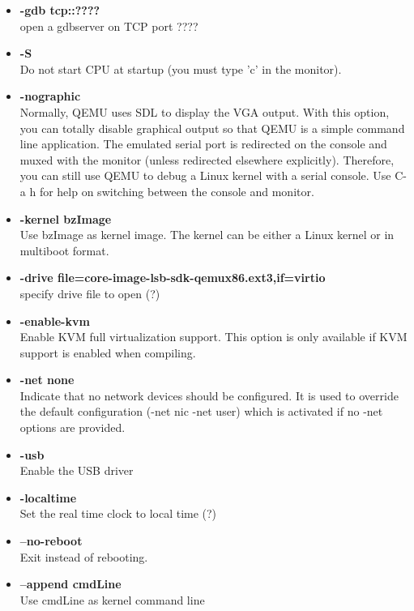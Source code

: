 \documentclass[letterpaper,10pt]{article}
\begin{document}
\begin{itemize}
\item{\textbf{-gdb tcp::???? }}\\
open a gdbserver on TCP port ????\\

\item{\textbf{-S }}\\
Do not start CPU at startup (you must type ’c’ in the monitor).\\

\item{\textbf{-nographic }}\\
Normally, QEMU uses SDL to display the VGA output. With this option, you can totally disable graphical output so that QEMU is a simple command line application. The emulated serial port is redirected on the console and muxed with the monitor (unless redirected elsewhere explicitly). Therefore, you can still use QEMU to debug a Linux kernel with a serial console. Use C-a h for help on switching between the console and monitor.\\

\item{\textbf{-kernel bzImage}}\\
Use bzImage as kernel image. The kernel can be either a Linux kernel or in multiboot format.\\

\item{\textbf{-drive file=core-image-lsb-sdk-qemux86.ext3,if=virtio }}\\
specify drive file to open (?)\\

\item{\textbf{-enable-kvm }}\\
Enable KVM full virtualization support. This option is only available if KVM support is enabled when compiling.\\

\item{\textbf{-net none}}\\
Indicate that no network devices should be configured. It is used to override the default configuration (-net nic -net user) which is activated if no -net options are provided.\\

\item{\textbf{-usb}}\\
Enable the USB driver\\

\item{\textbf{-localtime}}\\
Set the real time clock to local time (?)\\

\item{\textbf{--no-reboot}}\\
Exit instead of rebooting.

\item{\textbf{--append cmdLine}}\\
Use cmdLine as kernel command line\\

\end{itemize}
\end{document}
